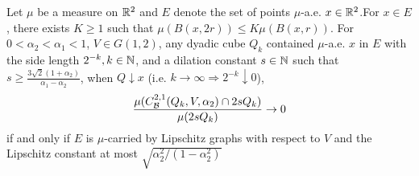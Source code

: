 \begin{lemma}\label{lemma:limQ-2sQ-0}
    Let $\mu$ be a measure on $\mathbb{R}^2$ and $E$ denote the set of points $\mu$-a.e. $x\in\mathbb{R}^2$.For $x\in E$, there exists $K\geq 1$ such that $\mu(B(x, 2r))\leq K\mu(B(x,r))$. For $0<\alpha_2<\alpha_1<1$, $V\in G(1,2)$, any dyadic cube $Q_k$ contained $\mu$-a.e. $x$ in $E$ with the side length $2^{-k}, k\in\mathbb{N}$, and a dilation constant $s\in\mathbb{N}$ such that $s \geq \frac{3\sqrt{2}(1+\alpha_2)}{\alpha_1-\alpha_2}$, when $Q\downarrow x$ (i.e. $k\rightarrow\infty \Rightarrow 2^{-k}\downarrow 0$),
    {\color{red}
    \begin{equation}\label{eq:limBC-2sQ-0}
        \frac{\mu(C_\mathcal B^{2,1}(Q_k, V, \alpha_2)\cap 2sQ_k)}{\mu(2sQ_k)} \rightarrow 0
    \end{equation}
    }
    if and only if $E$ is $\mu$-carried by Lipschitz graphs {\color{red}with respect to $V$ and the Lipschitz constant at most $\sqrt{\alpha_2^2/(1-\alpha_2^2)}$}
\end{lemma}
